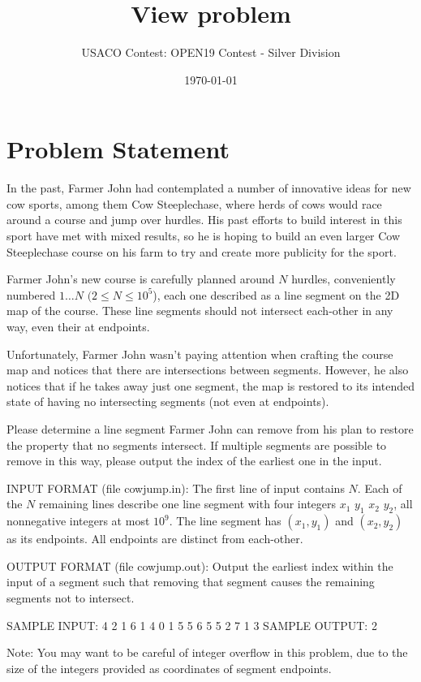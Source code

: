 \documentclass[12pt]{article}
\title{View problem}
\author{USACO Contest: OPEN19 Contest - Silver Division}
\date{\today}
\begin{document}
\maketitle

\section*{Problem Statement}

In the past, Farmer John had contemplated a number of innovative ideas for new
cow sports, among them Cow Steeplechase, where herds of cows would race around a
course and jump over hurdles.  His past efforts to build interest in this sport
have met with mixed results, so he is hoping to build an even larger Cow
Steeplechase course on his farm to try and create more publicity for the sport.

Farmer John's new course is carefully planned around $N$ hurdles, conveniently
numbered $1 \ldots N$ $(2 \leq N \leq 10^5$), each one described as a line
segment on the 2D map of the course.  These line segments should not intersect
each-other in any way, even their at endpoints.  

Unfortunately, Farmer John wasn't paying attention when crafting the course map
and notices that there are intersections between segments.  However, he also
notices that if he takes away just one segment, the map is restored to its
intended state of having no intersecting segments (not even at endpoints).

Please determine a line segment Farmer John can remove from his plan to  restore
the property that no segments intersect.  If multiple segments are possible to
remove in this way, please output the index of the earliest one in the input.

INPUT FORMAT (file cowjump.in):
The first line of input contains $N$.  Each of the $N$ remaining lines describe
one line segment with four integers $x_1$ $y_1$ $x_2$ $y_2$, all nonnegative
integers at most $10^9$.  The line segment has $(x_1, y_1)$ and $(x_2, y_2)$  as
its endpoints.  All endpoints are distinct from each-other.

OUTPUT FORMAT (file cowjump.out):
Output the earliest index within the input of a segment such that removing that
segment causes the remaining segments not to intersect.

SAMPLE INPUT:
4
2 1 6 1
4 0 1 5
5 6 5 5
2 7 1 3
SAMPLE OUTPUT: 
2

Note: You may want to be careful of integer overflow in this problem, due to the
size of the integers provided as coordinates of segment endpoints.
\end{document}
